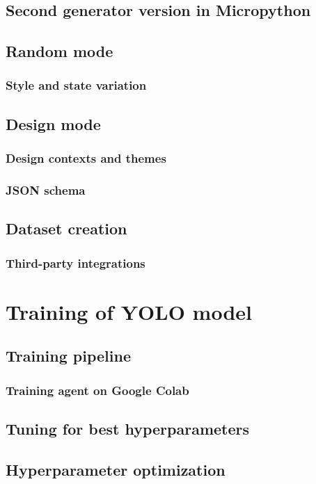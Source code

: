 \documentclass[Bachelor, BIC, english, fhCitStyle, IEEE]{BASE/twbook} %
\begin{document}
\section{Second generator version in Micropython}
\section{Random mode}
\subsection{Style and state variation}
\section{Design mode}
\subsection{Design contexts and themes}
\subsection{JSON schema}
\section{Dataset creation}
\subsection{Third-party integrations} %
\clearpage
\chapter{Training of YOLO model}
\section{Training pipeline}
\subsection{Training agent on Google Colab}
\section{Tuning for best hyperparameters}
\section{Hyperparameter optimization}
\end{document}
